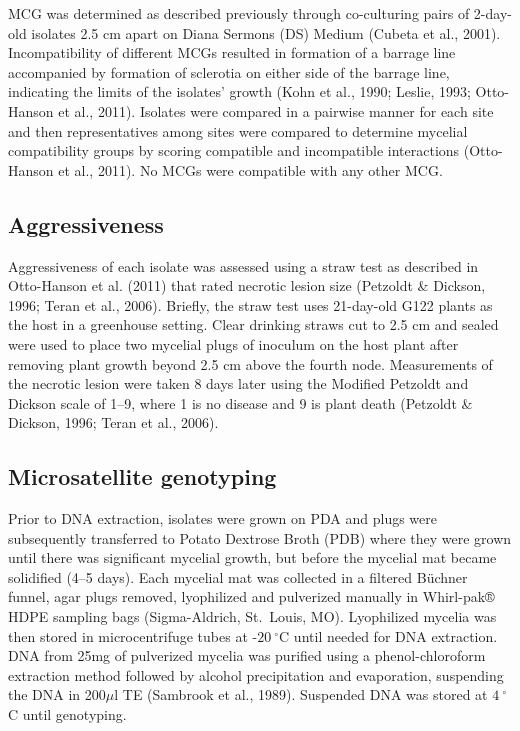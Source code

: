 \documentclass[fleqn,10pt,lineno]{wlpeerj} %
\theoremstyle{definition}
\theoremstyle{definition}
\theoremstyle{definition}
\theoremstyle{remark}
\begin{document}
MCG was determined as described previously through co-culturing pairs of
2-day-old isolates 2.5 cm apart on Diana Sermons (DS) Medium (Cubeta et
al., 2001). Incompatibility of different MCGs resulted in formation of a
barrage line accompanied by formation of sclerotia on either side of the
barrage line, indicating the limits of the isolates' growth (Kohn et
al., 1990; Leslie, 1993; Otto-Hanson et al., 2011). Isolates were
compared in a pairwise manner for each site and then representatives
among sites were compared to determine mycelial compatibility groups by
scoring compatible and incompatible interactions (Otto-Hanson et al.,
2011). No MCGs were compatible with any other MCG.

\subsection*{Aggressiveness}\label{aggressiveness}

Aggressiveness of each isolate was assessed using a straw test as
described in Otto-Hanson et al. (2011) that rated necrotic lesion size
(Petzoldt \& Dickson, 1996; Teran et al., 2006). Briefly, the straw test
uses 21-day-old G122 plants as the host in a greenhouse setting. Clear
drinking straws cut to 2.5 cm and sealed were used to place two mycelial
plugs of inoculum on the host plant after removing plant growth beyond
2.5 cm above the fourth node. Measurements of the necrotic lesion were
taken 8 days later using the Modified Petzoldt and Dickson scale of
1--9, where 1 is no disease and 9 is plant death (Petzoldt \& Dickson,
1996; Teran et al., 2006).

\subsection*{Microsatellite genotyping}\label{microsatellite-genotyping}

Prior to DNA extraction, isolates were grown on PDA and plugs were
subsequently transferred to Potato Dextrose Broth (PDB) where they were
grown until there was significant mycelial growth, but before the
mycelial mat became solidified (4--5 days). Each mycelial mat was
collected in a filtered Büchner funnel, agar plugs removed, lyophilized
and pulverized manually in Whirl-pak® HDPE sampling bags (Sigma-Aldrich,
St.~Louis, MO). Lyophilized mycelia was then stored in microcentrifuge
tubes at -\(20~^{\circ}\)C until needed for DNA extraction. DNA from
25mg of pulverized mycelia was purified using a phenol-chloroform
extraction method followed by alcohol precipitation and evaporation,
suspending the DNA in 200\(\mu\)l TE (Sambrook et al., 1989). Suspended
DNA was stored at \(4~^{\circ}\)C until genotyping.
\end{document}
